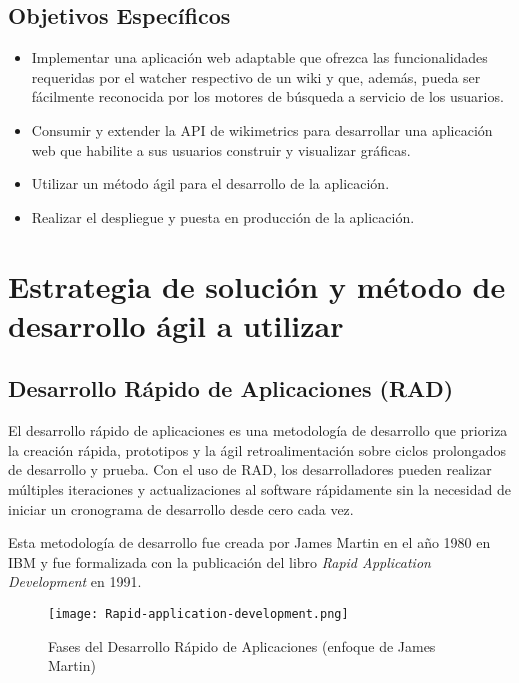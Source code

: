 \subsection{Objetivos Específicos}

\begin{itemize}
    \item Implementar una aplicación web adaptable que ofrezca las funcionalidades requeridas por el watcher respectivo de un wiki y que, además, pueda ser fácilmente reconocida por los motores de búsqueda a servicio de los usuarios.
    \item Consumir y extender la API de wikimetrics para desarrollar una aplicación web que habilite a sus usuarios construir y visualizar gráficas.
    \item Utilizar un método ágil para el desarrollo de la aplicación.
    \item Realizar el despliegue y puesta en producción de la aplicación.
\end{itemize}

\section{Estrategia de solución y método de desarrollo ágil a utilizar}

\subsection{Desarrollo Rápido de Aplicaciones (RAD)}


El desarrollo rápido de aplicaciones es una metodología de desarrollo que prioriza la creación rápida, prototipos y la ágil retroalimentación sobre ciclos prolongados de desarrollo y prueba. Con el uso de RAD, los desarrolladores pueden realizar múltiples iteraciones y actualizaciones al software rápidamente sin la necesidad de iniciar un cronograma de desarrollo desde cero cada vez.

Esta metodología de desarrollo fue creada por James Martin en el año 1980 en IBM y fue formalizada con la publicación del libro \emph{Rapid Application Development} en 1991.

\begin{figure}[H]
    \centering
    \texttt{[image: Rapid-application-development.png]}
    \caption{Fases del Desarrollo Rápido de Aplicaciones (enfoque de James Martin)}
    \label{fig:Rapid-application-development}
\end{figure}

